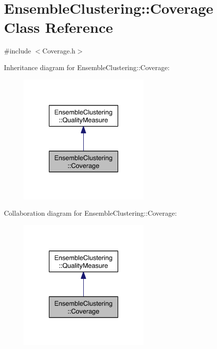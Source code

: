 \hypertarget{class_ensemble_clustering_1_1_coverage}{\section{Ensemble\-Clustering\-:\-:Coverage Class Reference}
\label{class_ensemble_clustering_1_1_coverage}
}


{\ttfamily \#include $<$Coverage.\-h$>$}



Inheritance diagram for Ensemble\-Clustering\-:\-:Coverage\-:
\nopagebreak
\begin{figure}[H]
\begin{center}
\leavevmode
\includegraphics[width=184pt]{class_ensemble_clustering_1_1_coverage__inherit__graph}
\end{center}
\end{figure}


Collaboration diagram for Ensemble\-Clustering\-:\-:Coverage\-:
\nopagebreak
\begin{figure}[H]
\begin{center}
\leavevmode
\includegraphics[width=184pt]{class_ensemble_clustering_1_1_coverage__coll__graph}
\end{center}
\end{figure}
